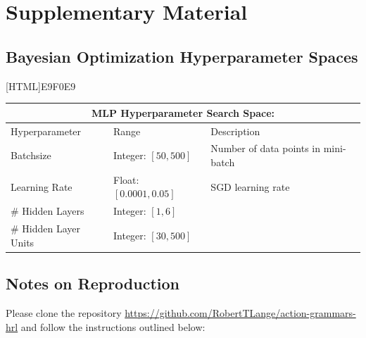 \documentclass[colorinlistoftodos]{article}
\theoremstyle{definition}
\begin{document}
{\footnotesize }

\section*{Supplementary Material}

\subsection*{Bayesian Optimization Hyperparameter Spaces}

[HTML]{E9F0E9}{\parbox{\textwidth}{%
\small{
\begin{center}
\begin{tabular}{ |p{3cm}||p{3cm}|p{6cm}| }
 \hline
 \multicolumn{3}{|c|}{\textbf{MLP Hyperparameter Search Space:}} \\
 \hline
Hyperparameter & Range & Description\\
 \hline
 Batchsize & Integer: $[50, 500]$ & Number of data points in mini-batch\\
 Learning Rate & Float: $[0.0001, 0.05]$ & SGD learning rate\\
 \# Hidden Layers & Integer: $[1, 6]$ & \\ 
 \# Hidden Layer Units & Integer: $[30, 500]$ & \\ 
 \hline
\end{tabular}	
\end{center}
}}}


\subsection*{Notes on Reproduction}

Please clone the repository \url{https://github.com/RobertTLange/action-grammars-hrl} and follow the instructions outlined below:
\end{document}
